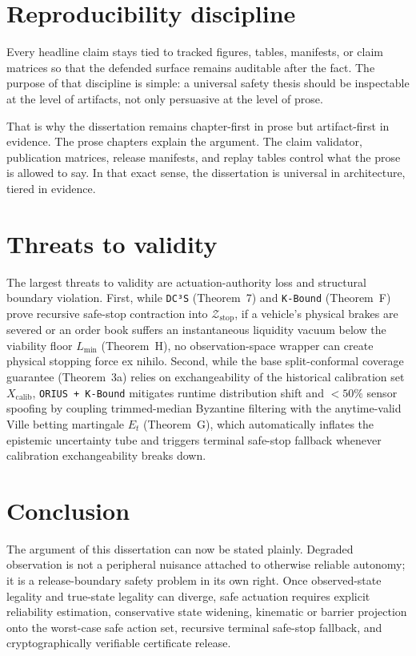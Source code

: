 
\section{Reproducibility discipline}
Every headline claim stays tied to tracked figures, tables, manifests, or claim matrices so
that the defended surface remains auditable after the fact. The purpose of that discipline is
simple: a universal safety thesis should be inspectable at the level of artifacts, not only
persuasive at the level of prose.

That is why the dissertation remains chapter-first in prose but artifact-first in evidence.
The prose chapters explain the argument. The claim validator, publication matrices, release
manifests, and replay tables control what the prose is allowed to say. In that exact sense,
the dissertation is universal in architecture, tiered in evidence.

\section{Threats to validity}
The largest threats to validity are actuation-authority loss and structural boundary violation.
First, while \texttt{DC³S} (Theorem~7) and \texttt{K-Bound} (Theorem~F) prove recursive safe-stop
contraction into $\mathcal{Z}_{\text{stop}}$, if a vehicle's physical brakes are severed or an
order book suffers an instantaneous liquidity vacuum below the viability floor $L_{\min}$
(Theorem~H), no observation-space wrapper can create physical stopping force ex nihilo.
Second, while the base split-conformal coverage guarantee (Theorem~3a) relies on exchangeability
of the historical calibration set $X_{\text{calib}}$, \texttt{ORIUS + K-Bound} mitigates runtime
distribution shift and $<50\%$ sensor spoofing by coupling trimmed-median Byzantine filtering
with the anytime-valid Ville betting martingale $E_t$ (Theorem~G), which automatically inflates
the epistemic uncertainty tube and triggers terminal safe-stop fallback whenever calibration
exchangeability breaks down.

\section{Conclusion}
The argument of this dissertation can now be stated plainly. Degraded observation is not a
peripheral nuisance attached to otherwise reliable autonomy; it is a release-boundary safety
problem in its own right. Once observed-state legality and true-state legality can diverge,
safe actuation requires explicit reliability estimation, conservative state widening,
kinematic or barrier projection onto the worst-case safe action set, recursive terminal
safe-stop fallback, and cryptographically verifiable certificate release.

